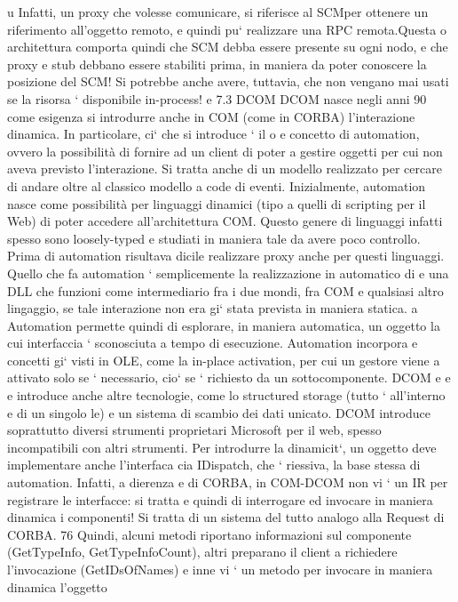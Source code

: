 \documentclass[a4paper,12pt]{article}
\begin{document}
u
Infatti, un proxy che volesse comunicare, si riferisce al SCMper ottenere un
riferimento all'oggetto remoto, e quindi pu` realizzare una RPC remota.Questa
o
architettura comporta quindi che SCM debba essere presente su ogni nodo, e
che proxy e stub debbano essere stabiliti prima, in maniera da poter conoscere
la posizione del SCM! Si potrebbe anche avere, tuttavia, che non vengano mai
usati se la risorsa ` disponibile in-process!
e
7.3
DCOM
DCOM nasce negli anni 90 come esigenza si introdurre anche in COM (come
in CORBA) l'interazione dinamica. In particolare, ci` che si introduce ` il
o
e
concetto di automation, ovvero la possibilità di fornire ad un client di poter
a
gestire oggetti per cui non aveva previsto l'interazione. Si tratta anche di un
modello realizzato per cercare di andare oltre al classico modello a code di eventi.
Inizialmente, automation nasce come possibilità per linguaggi dinamici (tipo
a
quelli di scripting per il Web) di poter accedere all'architettura COM. Questo
genere di linguaggi infatti spesso sono loosely-typed e studiati in maniera tale
da avere poco controllo. Prima di automation risultava dicile realizzare proxy
anche per questi linguaggi.
Quello che fa automation ` semplicemente la realizzazione in automatico di
e
una DLL che funzioni come intermediario fra i due mondi, fra COM e qualsiasi
altro lingaggio, se tale interazione non era gi` stata prevista in maniera statica.
a
Automation permette quindi di esplorare, in maniera automatica, un oggetto
la cui interfaccia ` sconosciuta a tempo di esecuzione. Automation incorpora
e
concetti gi` visti in OLE, come la in-place activation, per cui un gestore viene
a
attivato solo se ` necessario, cio` se ` richiesto da un sottocomponente. DCOM
e
e e
introduce anche altre tecnologie, come lo structured storage (tutto ` all'interno
e
di un singolo le) e un sistema di scambio dei dati unicato. DCOM introduce
soprattutto diversi strumenti proprietari Microsoft per il web, spesso incompatibili con altri strumenti.
Per introdurre la dinamicit`, un oggetto deve implementare anche l'interfaca
cia IDispatch, che ` riessiva, la base stessa di automation. Infatti, a dierenza
e
di CORBA, in COM-DCOM non vi ` un IR per registrare le interfacce: si tratta
e
quindi di interrogare ed invocare in maniera dinamica i componenti! Si tratta
di un sistema del tutto analogo alla Request di CORBA.
76
Quindi, alcuni metodi riportano informazioni sul componente (GetTypeInfo,
GetTypeInfoCount), altri preparano il client a richiedere l'invocazione (GetIDsOfNames) e inne vi ` un metodo per
invocare in maniera dinamica l'oggetto
\end{document}
